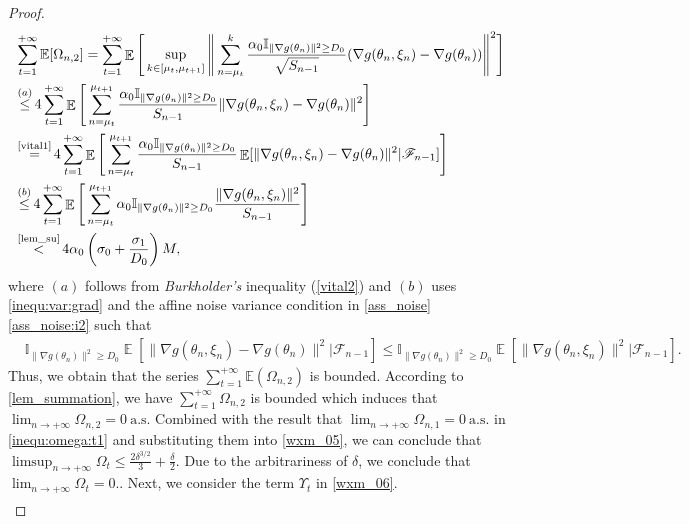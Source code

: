 \documentclass[standalone]{article}
\newcommand{\I}{\mathbb{I}}
\DeclareMathOperator{\Expect}{\mathbb{E}}
\begin{document}
\begin{proof}
\begin{align*}
&\sum_{t=1}^{+\infty}\mathbb{E}[\Omega_{n,2}]=\sum_{t=1}^{+\infty}\Expect\Bigg[\sup_{k\in[\mu_{t}, \mu_{t+1}]}\Bigg\|\sum_{n=\mu_{t}}^{k}\frac{\alpha_{0}\I_{\|\nabla g(\theta_{n})\|^{2}\ge D_{0}}}{\sqrt{S_{n-1}}}(\nabla g(\theta_{n},\xi_{n})-\nabla g(\theta_{n}))\Bigg\|^{2}\Bigg]\\&\mathop{\le}^{(a)} 4\sum_{t=1}^{+\infty}\Expect\Bigg[\sum_{n=\mu_{t}}^{\mu_{t+1}}\frac{\alpha_{0}\I_{\|\nabla g(\theta_{n})\|^{2}\ge D_{0}}}{{S_{n-1}}}\|\nabla g(\theta_{n},\xi_{n})-\nabla g(\theta_{n})\|^{2}\Bigg]\\& \mathop{=}^{\text{\cref{vital1}}} 4\sum_{t=1}^{+\infty}\Expect\Bigg[\sum_{n=\mu_{t}}^{\mu_{t+1}}\frac{\alpha_{0}\I_{\|\nabla g(\theta_{n})\|^{2}\ge D_{0}}}{{S_{n-1}}}\Expect[\|\nabla g(\theta_{n},\xi_{n})-\nabla g(\theta_{n})\|^{2}|\mathscr{F}_{n-1}]\Bigg]\\&\mathop{\le}^{(b)} 4\sum_{t=1}^{+\infty}\Expect\Bigg[\sum_{n=\mu_{t}}^{\mu_{t+1}} \alpha_{0}\I_{\|\nabla g(\theta_{n})\|^{2}\ge D_{0}}\frac{\|\nabla g(\theta_{n},\xi_{n})\|^{2}}{{S_{n-1}}}\Bigg]\\&\mathop{<}^{\text{\cref{lem_su}}} 4 \alpha_0 \left(\sigma_0 + \frac{\sigma_1}{D_0} \right)M,
\end{align*}
where $(a)$ follows from \emph{Burkholder's} inequality (\cref{vital2}) and $(b)$ uses \cref{inequ:var:grad} and the affine noise variance condition in \cref{ass_noise} \cref{ass_noise:i2} such that  \begin{align*}
&\I_{\|\nabla g(\theta_{n})\|^{2}\ge D_{0}}\Expect[\|\nabla g(\theta_{n},\xi_{n})-\nabla g(\theta_{n})\|^{2}|\mathscr{F}_{n-1}]\le \I_{\|\nabla g(\theta_{n})\|^{2}\ge D_{0}}\Expect[\|\nabla g(\theta_{n},\xi_{n})\|^{2}|\mathscr{F}_{n-1}].
\end{align*}
Thus, we obtain that the series $\sum_{t=1}^{+\infty}\mathbb{E}(\Omega_{n,2})$ is bounded. According to \cref{lem_summation}, we have $\sum_{t=1}^{+\infty}\Omega_{n,2}$ is bounded which induces that 
$\lim_{n \rightarrow +\infty} \Omega_{n,2} = 0 \ \text{a.s.} $
Combined with the result that $\lim_{n \rightarrow +\infty} \Omega_{n,1} = 0 \ \text{a.s.}$ in  \cref{inequ:omega:t1} and substituting them into \cref{wxm_05}, we can conclude that \(\limsup_{n\rightarrow+\infty}\Omega_{t}\le \frac{2\delta^{{3}/{2}}}{3}+\frac{\delta}{2}.\) Due to the arbitrariness of \(\delta\), we conclude that $\lim_{n\rightarrow+\infty}\Omega_{t}=0.
$. Next, we consider the term \(\Upsilon_{t}\) in \cref{wxm_06}.
\begin{align}\label{wxm_13}

\end{align}
\end{proof}
\end{document}
